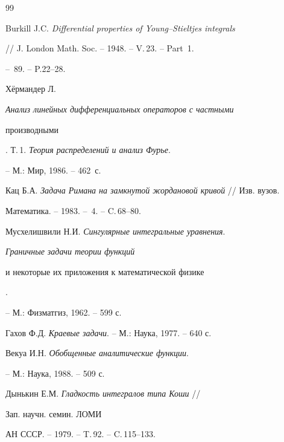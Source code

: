 \begin{thebibliography}{99}


Burkill J.C. {\em Differential properties of Young--Stieltjes integrals}


// J. London Math. Soc. -- 1948. -- V.\,23. -- Part~1.


-- \No\,89. -- P.22--28.




Х\"ермандер Л. {\em Анализ линейных дифференциальных операторов с частными


производными}. Т.\,1. {\em Теория распределений и анализ Фурье}.


-- М.: Мир, 1986. -- 462~с.




Кац Б.А. {\em Задача Римана на замкнутой жордановой кривой} // Изв. вузов.


Математика. -- 1983. -- \No\,4. -- C.\,68--80.




Мусхелишвили Н.И. {\em Сингулярные интегральные уравнения}.


{\em Граничные задачи теории функций


и некоторые их приложения к математической физике}.


-- М.: Физматгиз, 1962. -- 599 с.




Гахов Ф.Д. {\em Краевые задачи}. -- М.: Наука, 1977. -- 640 с.




Векуа И.Н. {\em Обобщенные аналитические функции}.


-- М.: Наука, 1988. -- 509 с.




Дынькин Е.М. {\em Гладкость интегралов типа Коши} //


Зап. научн. семин. ЛОМИ


АН СССР. -- 1979. -- T.\,92. -- C.\,115--133.





\end{thebibliography}





\vskip 2cm












\label{end}





